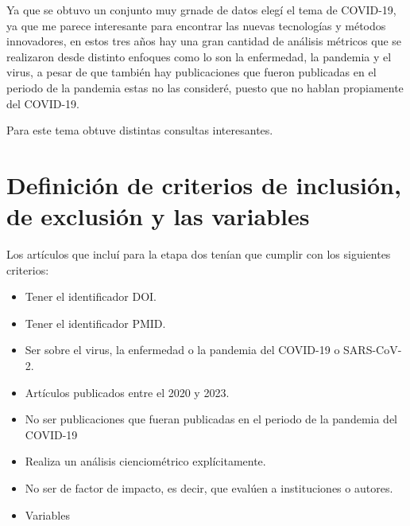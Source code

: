 \documentclass[../Main.tex]{subfiles}
\begin{document}
\smallskip
Ya que se obtuvo un conjunto muy grnade de datos elegí el tema de COVID-19, ya que me  parece interesante para encontrar las nuevas tecnologías y métodos innovadores, en estos tres años hay una gran cantidad de análisis métricos que se realizaron desde distinto enfoques como lo son la enfermedad, la pandemia y el virus, a pesar de que también hay publicaciones que fueron publicadas en el periodo de la pandemia estas no las consideré, puesto que no hablan propiamente del COVID-19.

\smallskip
Para este tema obtuve distintas consultas interesantes.\\

\noindent
{}

\section{Definición de criterios de inclusión, de exclusión y las variables}
\noindent
Los artículos que incluí para la etapa dos tenían que cumplir con los siguientes criterios:
\begin{itemize}
    \item Tener el identificador DOI.
    \item Tener el identificador PMID.
    \item Ser sobre el virus, la enfermedad o la pandemia del COVID-19 o SARS-CoV-2.
    \item Artículos publicados entre el 2020 y 2023.
    \item No ser publicaciones que fueran publicadas en el periodo de la pandemia del COVID-19
    \item Realiza un análisis cienciométrico explícitamente.
    \item No ser de factor de impacto, es decir, que evalúen a instituciones o autores.
    \item Variables
\end{itemize}
\end{document}
